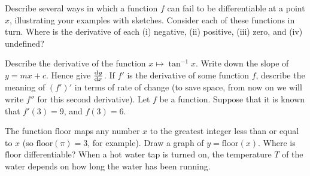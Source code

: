 \begin{questions}
\begin{multicols}{2}
    \end{multicols}
  \questioA Describe several ways in which a function $ f $ can fail to be differentiable at a point $ x $, illustrating your examples with sketches.
  \questioA Consider each of these functions in turn. Where is the derivative of each (i) negative, (ii) positive, (iii) zero, and (iv) undefined?
  \questioA Describe the derivative of the function $ x \mapsto \tan^{-1} x $.
  \questioA Write down the slope of $ y = mx + c $. Hence give $ \od{y}{x} $.
  \questioA If $ f' $ is the derivative of some function $ f $, describe the meaning of $ (f')' $ in terms of rate of change (to save space, from now on we
            will write $ f'' $ for this second derivative).
  \questioA Let $ f $ be a function. Suppose that it is known that $ f'(3) = 9 $, and $ f(3) = 6 $.
  \questioM The function $ \mathrm{floor} $ maps any number $ x $ to the greatest integer less than or equal to $ x $ (so $ \mathrm{floor}(\pi) = 3 $, for
            example). Draw a graph of $ y = \mathrm{floor}(x) $. Where is $ \mathrm{floor} $ differentiable?
  \questioM When a hot water tap is turned on, the temperature $ T $ of the water depends on how long
            the water has been running.
    \begin{parts}

\end{parts}
\end{questions}
